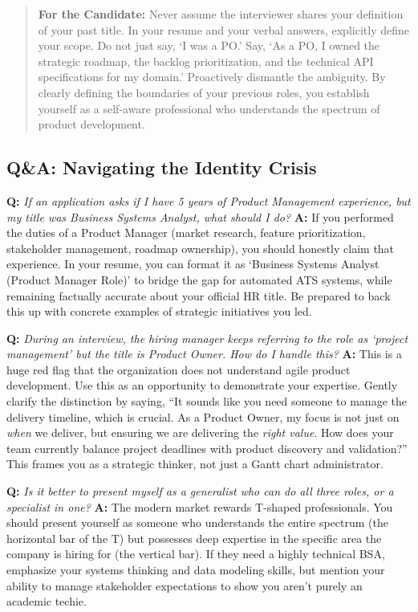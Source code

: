 \begin{quote}
\textbf{For the Candidate:} Never assume the interviewer shares your
definition of your past title. In your resume and your verbal answers,
explicitly define your scope. Do not just say, `I was a PO.' Say, `As a
PO, I owned the strategic roadmap, the backlog prioritization, and the
technical API specifications for my domain.' Proactively dismantle the
ambiguity. By clearly defining the boundaries of your previous roles,
you establish yourself as a self-aware professional who understands the
spectrum of product development.
\end{quote}

\subsection{Q\&A: Navigating the Identity
Crisis}\label{qa-navigating-the-identity-crisis}

\textbf{Q:} \emph{If an application asks if I have 5 years of Product
Management experience, but my title was Business Systems Analyst, what
should I do?} \textbf{A:} If you performed the duties of a Product
Manager (market research, feature prioritization, stakeholder
management, roadmap ownership), you should honestly claim that
experience. In your resume, you can format it as `Business Systems
Analyst (Product Manager Role)' to bridge the gap for automated ATS
systems, while remaining factually accurate about your official HR
title. Be prepared to back this up with concrete examples of strategic
initiatives you led.

\textbf{Q:} \emph{During an interview, the hiring manager keeps
referring to the role as `project management' but the title is Product
Owner. How do I handle this?} \textbf{A:} This is a huge red flag that
the organization does not understand agile product development. Use this
as an opportunity to demonstrate your expertise. Gently clarify the
distinction by saying, ``It sounds like you need someone to manage the
delivery timeline, which is crucial. As a Product Owner, my focus is not
just on \emph{when} we deliver, but ensuring we are delivering the
\emph{right value}. How does your team currently balance project
deadlines with product discovery and validation?'' This frames you as a
strategic thinker, not just a Gantt chart administrator.

\textbf{Q:} \emph{Is it better to present myself as a generalist who can
do all three roles, or a specialist in one?} \textbf{A:} The modern
market rewards T-shaped professionals. You should present yourself as
someone who understands the entire spectrum (the horizontal bar of the
T) but possesses deep expertise in the specific area the company is
hiring for (the vertical bar). If they need a highly technical BSA,
emphasize your systems thinking and data modeling skills, but mention
your ability to manage stakeholder expectations to show you aren't
purely an academic techie.

